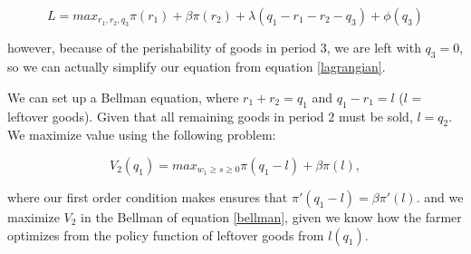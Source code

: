 \documentclass[11pt]{article}
\begin{document}
\begin{equation}\label{lagrangian}
	L = max_{r_1,r_2,q_3}\pi(r_1) + \beta\pi(r_2) + \lambda(q_1 - r_1 - r_2 - q_3) + \phi(q_3)
\end{equation}

however, because of the perishability of goods in period 3, we are left with $q_3 = 0$, so we can actually simplify our equation from equation \ref{lagrangian}.

We can set up a Bellman equation, where $r_1 + r_2 = q_1$ and $q_1 - r_1 = l$ ($l$ = leftover goods). Given that all remaining goods in period $2$ must be sold, $l = q_2$. We maximize value using the following problem:

\begin{equation}\label{bellman}
	V_2(q_1) = max_{w_1\geq{}s\geq{}0}\pi(q_1 - l) + \beta\pi(l),
\end{equation}

where our first order condition makes ensures that $\pi'(q_1 - l) = \beta\pi'(l)$. and we maximize $V_2$ in the Bellman of equation \ref{bellman}, given we know how the farmer optimizes from the policy function of leftover goods from $l(q_1)$.
\end{document}
